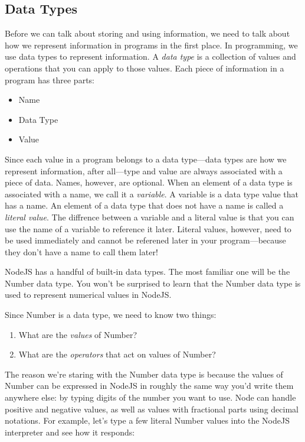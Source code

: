 \subsection{Data Types}
Before we can talk about storing and using information, we need to talk about how we represent information in programs in the first place. In programming, we use data types to represent information. A \emph{data type} is a collection of values and operations that you can apply to those values. Each piece of information in a program has three parts:

\begin{itemize}
  \item Name
  \item Data Type
  \item Value
\end{itemize}

Since each value in a program belongs to a data type---data types are how we represent information, after all---type and value are always associated with a piece of data. Names, however, are optional. When an element of a data type is associated with a name, we call it a \emph{variable}. A variable is a data type value that has a name. An element of a data type that does not have a name is called a \emph{literal value}. The diffrence between a variable and a literal value is that you can use the name of a variable to reference it later. Literal values, however, need to be used immediately and cannot be referened later in your program---because they don't have a name to call them later!

NodeJS has a handful of built-in data types. The most familiar one will be the \textsf{Number} data type. You won't be surprised to learn that the \textsf{Number} data type is used to represent numerical values in NodeJS.

Since \textsf{Number} is a data type, we need to know two things:
\begin{enumerate}
  \item What are the \emph{values} of \textsf{Number}?
  \item What are the \emph{operators} that act on values of \textsf{Number}?
\end{enumerate}

The reason we're staring with the \textsf{Number} data type is because the values of \textsf{Number} can be expressed in NodeJS in roughly the same way you'd write them anywhere else: by typing digits of the number you want to use. Node can handle positive and negative values, as well as values with fractional parts using decimal notations. For example, let's type a few literal \textsf{Number} values into the NodeJS interpreter and see how it responds:


